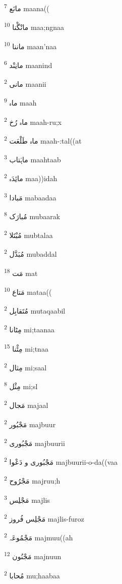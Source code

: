 \documentclass[12pt]{article}
\begin{document}
\begin{RTL}
\begin{multicols}{5}
{\ur مانَع}   \textsuperscript{7} maana((

{\ur مانْگْنا}   \textsuperscript{10} maa;ngnaa

{\ur ماننا}   \textsuperscript{10} maan'naa

{\ur مانِنْد}   \textsuperscript{6} maanind

{\ur مانی}   \textsuperscript{2} maanii

{\ur ماہ}   \textsuperscript{9} maah

{\ur ماہ رُخ}   \textsuperscript{2} maah-ru;x

{\ur ماہ طَلْعَت}   \textsuperscript{2} maah-:tal((at

{\ur ماہْتاب}   \textsuperscript{3} maahtaab

{\ur مائِدَہ}   \textsuperscript{2} maa))idah

{\ur مَبادا}   \textsuperscript{3} mabaadaa

{\ur مُبارَک}   \textsuperscript{8} mubaarak

{\ur مُبْتَلا}   \textsuperscript{2} mubtalaa

{\ur مُبَدَّل}   \textsuperscript{2} mubaddal

{\ur مَت}   \textsuperscript{18} mat

{\ur مَتاع}   \textsuperscript{10} mataa((

{\ur مُتَقابِل}   \textsuperscript{2} mutaqaabil

{\ur مِٹانا}   \textsuperscript{2} mi;taanaa

{\ur مِٹْنا}   \textsuperscript{15} mi;tnaa

{\ur مِثال}   \textsuperscript{2} mi;saal

{\ur مِثْل}   \textsuperscript{8} mi;sl

{\ur مَجال}   \textsuperscript{2} majaal

{\ur مَجْبُور}   \textsuperscript{2} majbuur

{\ur مَجْبُوری}   \textsuperscript{2} majbuurii

{\ur مَجْبُوری و دَعْوا}   \textsuperscript{2} majbuurii-o-da((vaa

{\ur مَجْرُوح}   \textsuperscript{2} majruu;h

{\ur مَجْلِس}   \textsuperscript{3} majlis

{\ur مَجْلِس فُروز}   \textsuperscript{2} majlis-furoz

{\ur مَجْمُوعَہ}   \textsuperscript{2} majmuu((ah

{\ur مَجْنُون}   \textsuperscript{12} majnuun

{\ur مُحابا}   \textsuperscript{2} mu;haabaa


\end{multicols}
\end{RTL}
\end{document}
